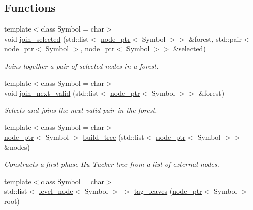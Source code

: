 \subsection*{Functions}
\begin{DoxyCompactItemize}
\item 
{\footnotesize template$<$class Symbol  = char$>$ }\\void \mbox{\hyperlink{namespaceirk_1_1coding_1_1hutucker_a3cce9468fb0b4bd0b2f30422b8c00284}{join\+\_\+selected}} (std\+::list$<$ \mbox{\hyperlink{namespaceirk_1_1coding_1_1hutucker_aa5d22cfdf05ffec38f2531e0307248fe}{node\+\_\+ptr}}$<$ Symbol $>$$>$ \&forest, std\+::pair$<$ \mbox{\hyperlink{namespaceirk_1_1coding_1_1hutucker_aa5d22cfdf05ffec38f2531e0307248fe}{node\+\_\+ptr}}$<$ Symbol $>$, \mbox{\hyperlink{namespaceirk_1_1coding_1_1hutucker_aa5d22cfdf05ffec38f2531e0307248fe}{node\+\_\+ptr}}$<$ Symbol $>$$>$ \&selected)
\begin{DoxyCompactList}\small\item\em Joins together a pair of selected nodes in a forest. \end{DoxyCompactList}\item 
{\footnotesize template$<$class Symbol  = char$>$ }\\void \mbox{\hyperlink{namespaceirk_1_1coding_1_1hutucker_ad43136697500a2cc05315ab694767d84}{join\+\_\+next\+\_\+valid}} (std\+::list$<$ \mbox{\hyperlink{namespaceirk_1_1coding_1_1hutucker_aa5d22cfdf05ffec38f2531e0307248fe}{node\+\_\+ptr}}$<$ Symbol $>$$>$ \&forest)
\begin{DoxyCompactList}\small\item\em Selects and joins the next valid pair in the forest. \end{DoxyCompactList}\item 
{\footnotesize template$<$class Symbol  = char$>$ }\\\mbox{\hyperlink{namespaceirk_1_1coding_1_1hutucker_aa5d22cfdf05ffec38f2531e0307248fe}{node\+\_\+ptr}}$<$ Symbol $>$ \mbox{\hyperlink{namespaceirk_1_1coding_1_1hutucker_ae962db3e3b0d823d81dd74c57e129887}{build\+\_\+tree}} (std\+::list$<$ \mbox{\hyperlink{namespaceirk_1_1coding_1_1hutucker_aa5d22cfdf05ffec38f2531e0307248fe}{node\+\_\+ptr}}$<$ Symbol $>$$>$ \&nodes)
\begin{DoxyCompactList}\small\item\em Constructs a first-\/phase Hu-\/\+Tucker tree from a list of external nodes. \end{DoxyCompactList}\item 
{\footnotesize template$<$class Symbol  = char$>$ }\\std\+::list$<$ \mbox{\hyperlink{structirk_1_1coding_1_1hutucker_1_1level__node}{level\+\_\+node}}$<$ Symbol $>$ $>$ \mbox{\hyperlink{namespaceirk_1_1coding_1_1hutucker_ab9d1b71846f97891dc2d3f262f5e73ec}{tag\+\_\+leaves}} (\mbox{\hyperlink{namespaceirk_1_1coding_1_1hutucker_aa5d22cfdf05ffec38f2531e0307248fe}{node\+\_\+ptr}}$<$ Symbol $>$ root)

\end{DoxyCompactItemize}
